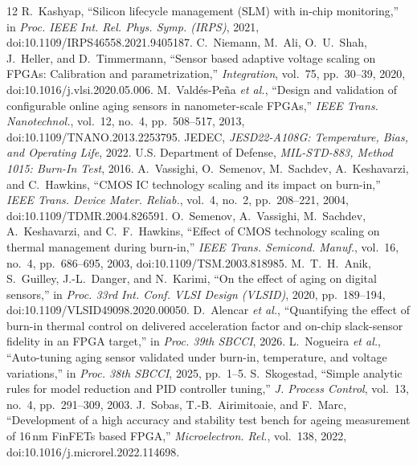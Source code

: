 \documentclass[10pt,twocolumn]{article}
\begin{document}
\renewcommand{\refname}{References}\begin{thebibliography}{12}
\footnotesize
{} R.~Kashyap, ``Silicon lifecycle management (SLM) with in-chip monitoring,'' in \emph{Proc. IEEE Int. Rel. Phys. Symp. (IRPS)}, 2021, doi:10.1109/IRPS46558.2021.9405187.
 C.~Niemann, M.~Ali, O.~U.~Shah, J.~Heller, and D.~Timmermann, ``Sensor based adaptive voltage scaling on FPGAs: Calibration and parametrization,'' \emph{Integration}, vol.~75, pp.~30--39, 2020, doi:10.1016/j.vlsi.2020.05.006.
 M.~Vald\'es-Pe\~na \emph{et al.}, ``Design and validation of configurable online aging sensors in nanometer-scale FPGAs,'' \emph{IEEE Trans. Nanotechnol.}, vol.~12, no.~4, pp.~508--517, 2013, doi:10.1109/TNANO.2013.2253795.
 JEDEC, \emph{JESD22-A108G: Temperature, Bias, and Operating Life}, 2022.
 U.S. Department of Defense, \emph{MIL-STD-883, Method 1015: Burn-In Test}, 2016.
 A.~Vassighi, O.~Semenov, M.~Sachdev, A.~Keshavarzi, and C.~Hawkins, ``CMOS IC technology scaling and its impact on burn-in,'' \emph{IEEE Trans. Device Mater. Reliab.}, vol.~4, no.~2, pp.~208--221, 2004, doi:10.1109/TDMR.2004.826591.
 O.~Semenov, A.~Vassighi, M.~Sachdev, A.~Keshavarzi, and C.~F.~Hawkins, ``Effect of CMOS technology scaling on thermal management during burn-in,'' \emph{IEEE Trans. Semicond. Manuf.}, vol.~16, no.~4, pp.~686--695, 2003, doi:10.1109/TSM.2003.818985.
 M.~T.~H.~Anik, S.~Guilley, J.-L.~Danger, and N.~Karimi, ``On the effect of aging on digital sensors,'' in \emph{Proc. 33rd Int. Conf. VLSI Design (VLSID)}, 2020, pp.~189--194, doi:10.1109/VLSID49098.2020.00050.
 D.~Alencar \emph{et al.}, ``Quantifying the effect of burn-in thermal control on delivered acceleration factor and on-chip slack-sensor fidelity in an FPGA target,'' in \emph{Proc. 39th SBCCI}, 2026.
 L.~Nogueira \emph{et al.}, ``Auto-tuning aging sensor validated under burn-in, temperature, and voltage variations,'' in \emph{Proc. 38th SBCCI}, 2025, pp.~1--5.
 S.~Skogestad, ``Simple analytic rules for model reduction and PID controller tuning,'' \emph{J. Process Control}, vol.~13, no.~4, pp.~291--309, 2003.
 J.~Sobas, T.-B.~Airimitoaie, and F.~Marc, ``Development of a high accuracy and stability test bench for ageing measurement of 16\,nm FinFETs based FPGA,'' \emph{Microelectron. Rel.}, vol.~138, 2022, doi:10.1016/j.microrel.2022.114698.
\end{thebibliography}
\end{document}
